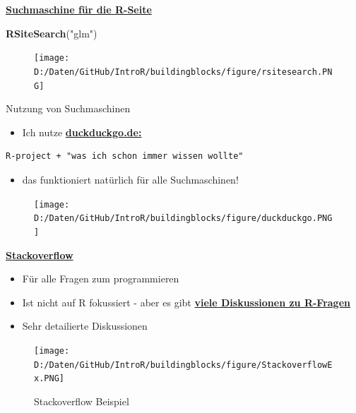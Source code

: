 \documentclass[ignorenonframetext,]{beamer}
\newenvironment{Shaded}{\begin{snugshade}}{\end{snugshade}}
\newcommand{\KeywordTok}[1]{\textcolor[rgb]{0.26,0.66,0.93}{\textbf{#1}}}
\newcommand{\StringTok}[1]{\textcolor[rgb]{0.02,0.61,0.04}{#1}}
\newcommand{\NormalTok}[1]{\textcolor[rgb]{0.74,0.68,0.62}{#1}}
\providecommand{\tightlist}{%
  \setlength{\itemsep}{0pt}\setlength{\parskip}{0pt}}
\begin{document}
\begin{frame}[fragile]{\href{http://search.r-project.org/cgi-bin/namazu.cgi?query=glm\&max=20\&result=normal\&sort=score\&idxname=functions\&idxname=vignettes\&idxname=views}{\textbf{Suchmaschine
für die R-Seite}}}

\begin{Shaded}
\begin{Highlighting}[]
\KeywordTok{RSiteSearch}\NormalTok{(}\StringTok{"glm"}\NormalTok{)}
\end{Highlighting}
\end{Shaded}

\begin{figure}
\centering
\texttt{[image: D:/Daten/GitHub/IntroR/buildingblocks/figure/rsitesearch.PNG]}
\caption{}
\end{figure}

\end{frame}

\begin{frame}[fragile]{Nutzung von Suchmaschinen}

\begin{itemize}
\tightlist
\item
  Ich nutze \href{}{\textbf{duckduckgo.de:}}
\end{itemize}

\begin{verbatim}
R-project + "was ich schon immer wissen wollte" 
\end{verbatim}

\begin{itemize}
\tightlist
\item
  das funktioniert natürlich für alle Suchmaschinen!
\end{itemize}

\begin{figure}
\centering
\texttt{[image: D:/Daten/GitHub/IntroR/buildingblocks/figure/duckduckgo.PNG]}
\caption{}
\end{figure}

\end{frame}

\begin{frame}{\href{http://stackoverflow.com/}{\textbf{Stackoverflow}}}

\begin{itemize}
\tightlist
\item
  Für alle Fragen zum programmieren
\item
  Ist nicht auf R fokussiert - aber es gibt
  \href{https://stackoverflow.com/tags/r/info}{\textbf{viele
  Diskussionen zu R-Fragen}}
\item
  Sehr detailierte Diskussionen
\end{itemize}

\begin{figure}
\centering
\texttt{[image: D:/Daten/GitHub/IntroR/buildingblocks/figure/StackoverflowEx.PNG]}
\caption{Stackoverflow Beispiel}
\end{figure}

\end{frame}
\end{document}
